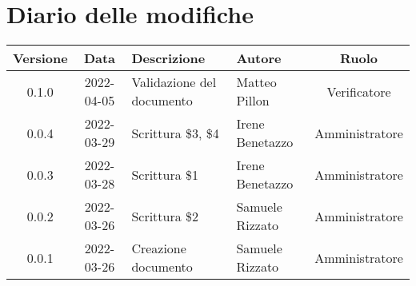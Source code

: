 \section*{Diario delle modifiche}
	\begin{center}
	\renewcommand{\arraystretch}{1.8} %
	\begin{tabular}{ |c|c|m{12em}|m{7em}|c| }
	\hline
	\textbf{Versione} & \textbf{Data} & \textbf{Descrizione} &  \textbf{Autore} &  \textbf{Ruolo} \\ %
	\hline 
	0.1.0 & 2022-04-05 & Validazione del documento & Matteo Pillon & Verificatore\\
	\hline
	0.0.4 & 2022-03-29 & Scrittura \$3, \$4 & Irene Benetazzo & Amministratore\\
	\hline
    0.0.3 & 2022-03-28 & Scrittura \$1 & Irene Benetazzo & Amministratore\\
	\hline
    0.0.2 & 2022-03-26 & Scrittura \$2 & Samuele \newline Rizzato & Amministratore\\
	\hline
    0.0.1 & 2022-03-26 & Creazione documento & Samuele \newline Rizzato & Amministratore\\
	\hline
	\end{tabular}
	\end{center}
	\newpage